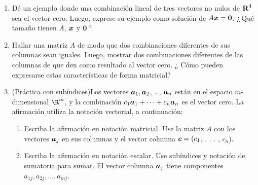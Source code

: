 \documentclass[12pt,a4paper]{article}
\newcommand{\bi}[1]{\hbox{\boldmath$#1$}}
\newcommand\1{\mbox{\,\vrule height-0.8pt depth1.0pt width2pc\,}}
\newcommand\2{\mbox{\,\vrule height-0.8pt depth1.0pt width1pc\,}}
\begin{document}
\begin{enumerate}


    
\item Dé un ejemplo donde una combinaci\'on lineal de tres vectores no nulos de $\hbox{\textbf{R}}^4$ sea el vector cero. Luego, exprese su ejemplo como soluci\'on de $A\bi{x}=\bi{0}$. ¿\,Qué tamaño tienen  $A$, $\bi{x}$ y $\bi{0}$\,? %



 



\item Hallar una matriz $A$ de modo que dos combinaciones diferentes de sus columnas sean iguales. Luego, mostrar dos combinaciones diferentes de las columnas de \A  que den como resultado al vector cero. ¿ Cómo pueden expresarse estas características de forma matricial?


\item (Práctica con subíndices)Los vectores $\bi{a}_{1}, \bi{a}_{2}$, \dots, $\bi{a}_{n}$ están en el espacio $m$-dimensional $\R^m$, y la combinación $c_{1}\bi{a}_{1}+\cdots+c_{n}\bi{a}_{n}$ es el vector cero. La afirmación utiliza la notación vectorial, a continuación:

\begin{enumerate}
\item [$(a)$] Escriba la afirmación en notaci\'on matricial. Use la matriz $A$ con los vectores $\bi{a}_j$ en sus columnas y el vector columna $\bi{c}=(c_{1}$, . . . , $c_{n}$).

\item [$(b)$] Escriba la afirmación en notaci\'on escalar. Use subíndices y notación de sumatoria para sumar. El vector columna $\bi{a}_{j}$ tiene componentes $a_{1j}, a_{2j},\ldots,a_{mj}$.
\end{enumerate}
 

\end{enumerate}
\end{document}

